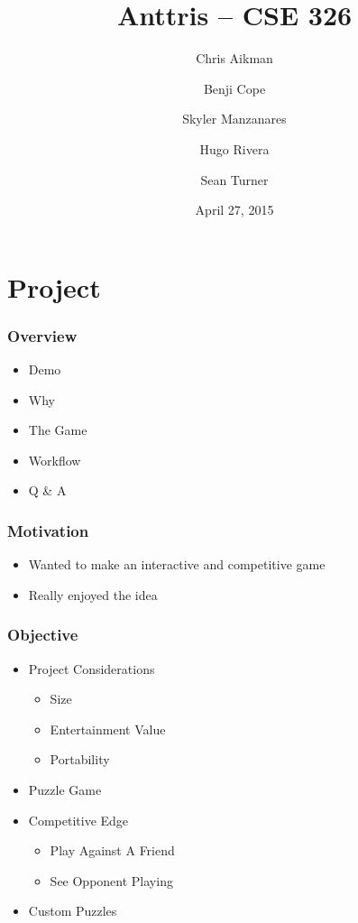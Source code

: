 \documentclass{beamer}
\title{Anttris -- CSE 326}
\author{%
\and Chris Aikman
\and Benji Cope
\and Skyler Manzanares
\and Hugo Rivera
\and Sean Turner}
\date{April 27, 2015}
\begin{document}
\section{Project}

\begin{frame}
  \titlepage
\end{frame}

\begin{frame}
  \frametitle{Overview} %
  \begin{itemize}
  \item Demo
  \item Why
  \item The Game
  \item Workflow
  \item Q & A
  \end{itemize}
\end{frame}

\begin{frame}
  \frametitle{Motivation} %
  \begin{itemize}
  \pause \item Wanted to make an interactive and competitive game
  \pause \item Really enjoyed the idea
  \end{itemize}
\end{frame}

\begin{frame}
  \frametitle{Objective} %
  \begin{itemize}
	\item Project Considerations
	\begin{itemize}
		\pause \item Size
		\pause \item Entertainment Value
		\pause \item Portability
	\end{itemize}
	\pause \item Puzzle Game
	\pause \item Competitive Edge
	\begin{itemize}
		\pause \item Play Against A Friend
		\pause \item See Opponent Playing
	\end{itemize}
	\pause \item Custom Puzzles
  \end{itemize}
\end{frame}

\end{document}
